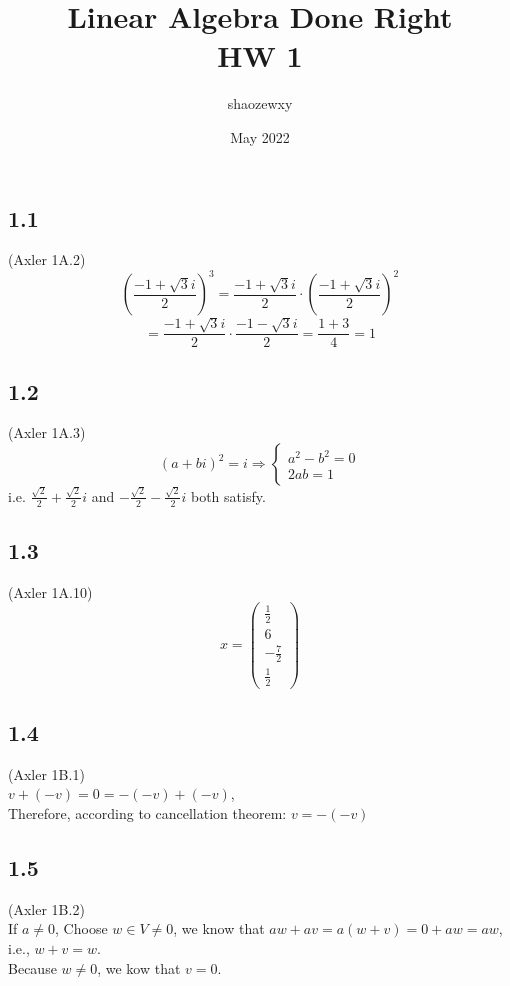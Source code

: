 \documentclass{article}
\title{Linear Algebra Done Right\\
\large{HW 1}}
\author{shaozewxy }
\date{May 2022}
\begin{document}
\maketitle

\setcounter{secnumdepth}{0}
\subsection{1.1}
(Axler 1A.2)\\
\begin{equation*}
    \left(\frac{-1+\sqrt{3}i}{2}\right)^3=\frac{-1+\sqrt{3}i}{2} \cdot \left(\frac{-1+\sqrt{3}i}{2}\right)^2
\end{equation*}
\begin{equation*}
    =\frac{-1+\sqrt{3}i}{2} \cdot \frac{-1-\sqrt{3}i}{2} = \frac{1+3}{4} = 1
\end{equation*}
\subsection{1.2}
(Axler 1A.3)\\
\begin{equation*}
    (a+bi)^2=i \Rightarrow \left\{
    \begin{matrix}
    a^2-b^2=0\\
    2ab=1
    \end{matrix}
\end{equation*}
i.e. $\frac{\sqrt{2}}{2}+\frac{\sqrt{2}}{2}i$ and $-\frac{\sqrt{2}}{2}-\frac{\sqrt{2}}{2}i$ both satisfy.
\subsection{1.3}
(Axler 1A.10)
\begin{equation*}
    x = \begin{pmatrix}
    \frac{1}{2} \\
    6 \\
    -\frac{7}{2} \\
    \frac{1}{2}
    \end{pmatrix}
\end{equation*}
\subsection{1.4}
(Axler 1B.1)\\
$v+(-v) = 0 = -(-v) + (-v)$,\\
Therefore, according to cancellation theorem: $v = -(-v)$
\subsection{1.5}
(Axler 1B.2)\\
If $a\neq 0$,
Choose $w \in V \neq 0$, we know that $aw + av = a(w+v) = 0 + aw = aw$, i.e., $w+v = w$.\\
Because $w \neq 0$, we kow that $v = 0$. 
\end{document}
